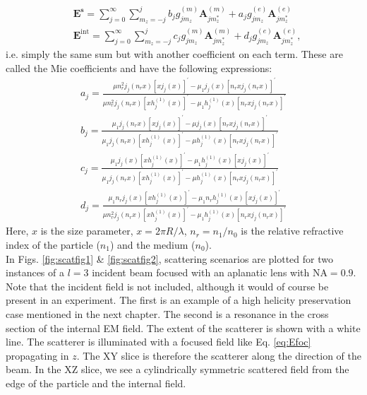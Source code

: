 \begin{align}
& \mathbf{E}^{\mathbf{s}}=\sum_{j=0}^{\infty}\sum_{m_z=-j}^j b_j g_{jm_z}^{(m)}\mathbf{A}_{j m_z^*}^{(m)}+ a_j g_{jm_z}^{(e)}\mathbf{A}_{j m_z^*}^{(e)}\label{eq:Mie_S} \\
& \mathbf{E}^{\mathrm{int}}=\sum_{j=0}^{\infty}\sum_{m_z=-j}^j c_jg_{jm_z}^{(m)} \mathbf{A}_{j m_z^*}^{(m)}+ d_jg_{jm_z}^{(e)} \mathbf{A}_{j m_z^*}^{(e)}\label{eq:Mie_I},
\end{align}
i.e. simply the same sum but with another coefficient on each term. These are called the Mie coefficients and have the following expressions:
\begin{gather}
a_j=\frac{\mu n_r^2 j_j\left(n_r x\right)\left[x j_j(x)\right]^{\prime}-\mu_1 j_j(x)\left[n_r x j_j\left(n_r x\right)\right]^{\prime}}{\mu n_r^2 j_j\left(n_r x\right)\left[x h_j^{(1)}(x)\right]^{\prime}-\mu_1 h_j^{(1)}(x)\left[n_r x j_j\left(n_r x\right)\right]^{\prime}} \\
b_j=\frac{\mu_1 j_j\left(n_r x\right)\left[x j_j(x)\right]^{\prime}-\mu j_j(x)\left[n_r x j_j\left(n_r x\right)\right]^{\prime}}{\mu_1 j_j\left(n_r x\right)\left[x h_j^{(1)}(x)\right]^{\prime}-\mu h_j^{(1)}(x)\left[n_r x j_j\left(n_r x\right)\right]^{\prime}} \\
c_j=\frac{\mu_1 j_j(x)\left[x h_j^{(1)}(x)\right]^{\prime}-\mu_1 h_j^{(1)}(x)\left[x j_j(x)\right]^{\prime}}{\mu_1 j_j\left(n_r x\right)\left[x h_j^{(1)}(x)\right]^{\prime}-\mu h_j^{(1)}(x)\left[n_r x j_j\left(n_r x\right)\right]^{\prime}} \\
d_j=\frac{\mu_1 n_r j_j(x)\left[x h_j^{(1)}(x)\right]^{\prime}-\mu_1 n_r h_j^{(1)}(x)\left[x j_j(x)\right]^{\prime}}{\mu n_r^2 j_j\left(n_r x\right)\left[x h_j^{(1)}(x)\right]^{\prime}-\mu_1 h_j^{(1)}(x)\left[n_r x j_j\left(n_r x\right)\right]^{\prime}}
\end{gather}  
Here, $x$ is the size parameter, $x=2\pi R/\lambda$, $n_r=n_1/n_0$ is the relative refractive index of the particle ($n_1$) and the medium ($n_0$).\\
In Figs. \ref{fig:scatfig1} \& \ref{fig:scatfig2}, scattering scenarios are plotted for two instances of a $l=3$ incident beam focused with an aplanatic lens with $\mathrm{NA}=0.9$. Note that the incident field is not included, although it would of course be present in an experiment.
The first is an example of a high helicity preservation case mentioned in the next chapter. The second is a resonance in the cross section of the internal EM field. The extent of the scatterer is shown with a white line. The scatterer is illuminated with a focused field like Eq. \ref{eq:Efoc} propagating in $z$. The XY slice is therefore the scatterer along the direction of the beam. In the XZ slice, we see a cylindrically symmetric scattered field from the edge of the particle and the internal field.\\
